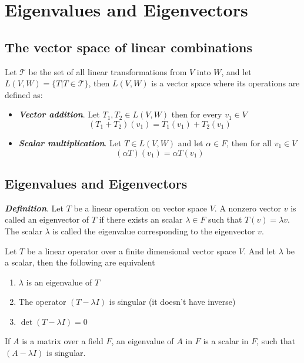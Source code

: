 \documentclass{report}
\begin{document}
    \tableofcontents
    \pagebreak
    \chapter{ Eigenvalues and Eigenvectors }

    \section{The vector space of linear combinations}

    Let $\mathcal{T}$ be the set of all linear transformations from $V$ into $W$, and let $L(V,W) = \{T| T \in \mathcal{T}\}$, then $L(V,W)$ is a vector space where its operations are defined as:

    \begin{itemize}
        \item \textit{\textbf{Vector addition}}. Let $T_1, T_2 \in L(V,W)$ then for every $v_1 \in V$
        $$(T_1+T_2)(v_1) = T_1(v_1) + T_2(v_1)$$
        \item \textit{\textbf{Scalar multiplication}}. Let $T \in L(V,W)$ and let $\alpha \in F$, then for all $v_1 \in V$
        $$(\alpha T)(v_1) = \alpha T(v_1)$$
    \end{itemize}

    \section{Eigenvalues and Eigenvectors}

    \begin{defBox}
        \textit{\textbf{Definition}}. Let $T$ be a linear operation on vector space $V$. A nonzero vector $v$ is called an eigenvector of $T$ if there exists an scalar $\lambda \in F$ such that $T(v) = \lambda v$. The scalar $\lambda$ is called the eigenvalue corresponding to the eigenvector $v$.
    \end{defBox}

    \begin{thBox}
        Let $T$ be a linear operator over a finite dimensional vector space $V$. And let $\lambda$ be a scalar, then the following are equivalent

        \begin{enumerate}
            \item $\lambda$ is an eigenvalue of $T$
            \item The operator $(T - \lambda I)$ is singular (it doesn't have inverse)
            \item $\det(T-\lambda I) = 0$
        \end{enumerate}
    \end{thBox}

    \begin{defBox}
        If $A$ is a matrix over a field $F$, an eigenvalue of $A$ in $F$ is a scalar in $F$, such that $(A - \lambda I)$ is singular.
    \end{defBox}
\end{document}
